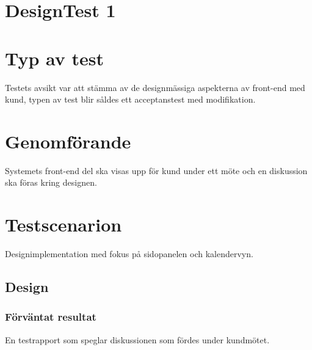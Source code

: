 \documentclass[a4paper,10pt, twoside]{article}
\begin{document}
\section{DesignTest 1} %
\section{Typ av test}
    Testets avsikt var att stämma av de designmässiga aspekterna av front-end med kund, typen av test blir såldes ett acceptanstest med modifikation.

\section{Genomförande}
    Systemets front-end del ska visas upp för kund under ett möte och en diskussion ska föras kring designen.

\section{Testscenarion}
    Designimplementation med fokus på sidopanelen och kalendervyn.

\subsection{Design}
\subsubsection{Förväntat resultat}
    En testrapport som speglar diskussionen som fördes under kundmötet.
\end{document}
